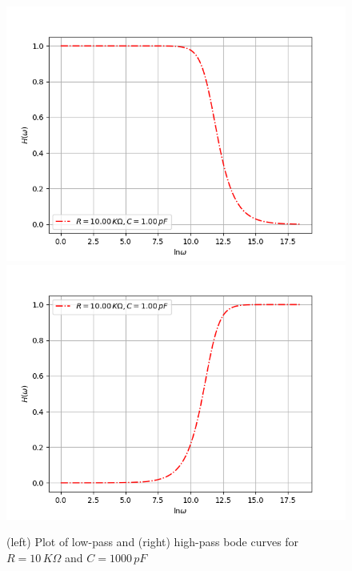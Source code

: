\documentclass[english]{article}
\begin{document}
\begin{figure}
	\centering
	\label{fig:boderc}
	\includegraphics[scale=0.4]{low_pass_question.png}
	\includegraphics[scale=0.4]{high_pass_question.png}
	\caption{(left) Plot of low-pass and (right) high-pass bode curves for $R=10\,K\Omega$ and $C=1000\,pF$}
\end{figure}
\end{document}
